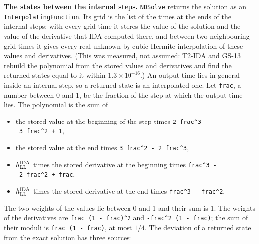 \documentclass[
  10pt,
]{article}
\providecommand{\tightlist}{%
  \setlength{\itemsep}{0pt}\setlength{\parskip}{0pt}}
\begin{document}
\textbf{The states between the internal steps.} \texttt{NDSolve} returns
the solution as an \texttt{InterpolatingFunction}. Its grid is the list
of the times at the ends of the internal steps; with every grid time it
stores the value of the solution and the value of the derivative that
IDA computed there, and between two neighbouring grid times it gives
every real unknown by cubic Hermite interpolation of these values and
derivatives. (This was measured, not assumed: T2-IDA and GS-13 rebuild
the polynomial from the stored values and derivatives and find the
returned states equal to it within \(1.3\times10^{-16}\).) An output
time lies in general inside an internal step, so a returned state is an
interpolated one. Let \texttt{frac}, a number between 0 and 1, be the
fraction of the step at which the output time lies. The polynomial is
the sum of

\begin{itemize}
\tightlist
\item
  the stored value at the beginning of the step times
  \texttt{2\ frac\^{}3\ -\ 3\ frac\^{}2\ +\ 1},
\item
  the stored value at the end times
  \texttt{3\ frac\^{}2\ -\ 2\ frac\^{}3},
\item
  \(h^{\rm IDA}_{\rm LL}\) times the stored derivative at the beginning
  times \texttt{frac\^{}3\ -\ 2\ frac\^{}2\ +\ frac},
\item
  \(h^{\rm IDA}_{\rm LL}\) times the stored derivative at the end times
  \texttt{frac\^{}3\ -\ frac\^{}2}.
\end{itemize}

The two weights of the values lie between 0 and 1 and their sum is 1.
The weights of the derivatives are \texttt{frac\ (1\ -\ frac)\^{}2} and
\texttt{-frac\^{}2\ (1\ -\ frac)}; the sum of their moduli is
\texttt{frac\ (1\ -\ frac)}, at most \(1/4\). The deviation of a
returned state from the exact solution has three sources:
\end{document}

